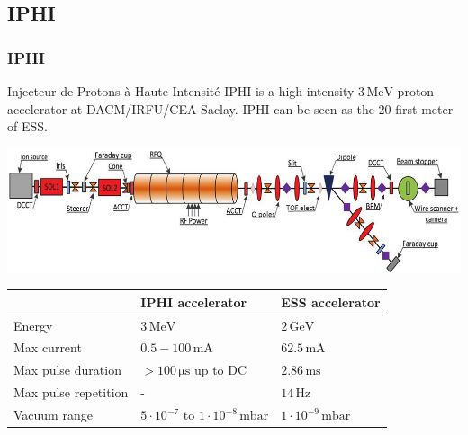 \subsection{IPHI}
\begin{frame}
  \frametitle{IPHI}
  \begin{block}{Injecteur de Protons à Haute Intensité}
    IPHI is a high intensity $3\,\mathrm{MeV}$ proton accelerator at DACM/IRFU/CEA Saclay. IPHI can be seen as the 20 first meter of ESS.
  \end{block}
  \includegraphics[width=1\textwidth]{04_Test/fig/fig000_IPHI_view.png}
  \begin{tabularx}{\linewidth}{XXX}
    \toprule
                         & IPHI accelerator                                  & ESS accelerator                \\
    \midrule
    Energy               & $3\,\mathrm{MeV}$                                 & $2\,\mathrm{GeV}$              \\
    Max current          & $0.5-100\,\mathrm{mA}$                            & $62.5\,\mathrm{mA}$            \\
    Max pulse duration   & $>100\,\mathrm{\mu s}$ up to DC                   & $2.86\,\mathrm{ms}$            \\
    Max pulse repetition & -                                                 & $14\,\mathrm{Hz}$              \\
    Vacuum range         & $5\cdot10^{-7}$ to $1\cdot10^{-8}\,\mathrm{mbar}$ & $1\cdot10^{-9}\,\mathrm{mbar}$ \\
    \bottomrule
  \end{tabularx}
\end{frame}

